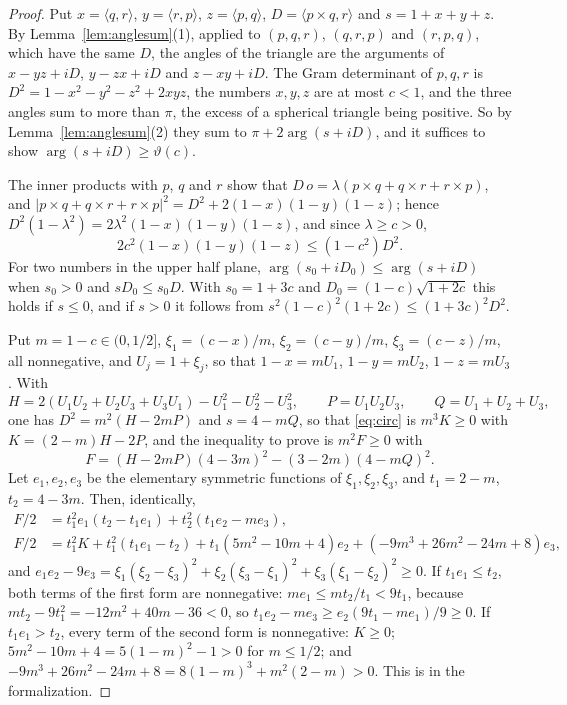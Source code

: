 \documentclass[12pt]{amsart}
\theoremstyle{definition}
\theoremstyle{plain}
\theoremstyle{definition}
\begin{document}
\begin{proof}
Put $x=\langle q,r\rangle$, $y=\langle r,p\rangle$, $z=\langle p,q\rangle$, $D=\langle p\times q,r\rangle$ and $s=1+x+y+z$. By Lemma~\ref{lem:anglesum}(1), applied to $(p,q,r)$, $(q,r,p)$ and $(r,p,q)$, which have the same $D$, the angles of the triangle are the arguments of $x-yz+iD$, $y-zx+iD$ and $z-xy+iD$. The Gram determinant of $p,q,r$ is $D^2=1-x^2-y^2-z^2+2xyz$, the numbers $x,y,z$ are at most $c<1$, and the three angles sum to more than $\pi$, the excess of a spherical triangle being positive. So by Lemma~\ref{lem:anglesum}(2) they sum to $\pi+2\arg(s+iD)$, and it suffices to show $\arg(s+iD)\ge\vartheta(c)$.

The inner products with $p$, $q$ and $r$ show that $D\,o=\lambda(p\times q+q\times r+r\times p)$, and $|p\times q+q\times r+r\times p|^2=D^2+2(1-x)(1-y)(1-z)$; hence $D^2(1-\lambda^2)=2\lambda^2(1-x)(1-y)(1-z)$, and since $\lambda\ge c>0$,
\begin{equation}\label{eq:circ}
2c^2(1-x)(1-y)(1-z)\le(1-c^2)D^2 .
\end{equation}
For two numbers in the upper half plane, $\arg(s_0+iD_0)\le\arg(s+iD)$ when $s_0>0$ and $sD_0\le s_0D$. With $s_0=1+3c$ and $D_0=(1-c)\sqrt{1+2c}$ this holds if $s\le0$, and if $s>0$ it follows from $s^2(1-c)^2(1+2c)\le(1+3c)^2D^2$.

Put $m=1-c\in(0,1/2]$, $\xi_1=(c-x)/m$, $\xi_2=(c-y)/m$, $\xi_3=(c-z)/m$, all nonnegative, and $U_j=1+\xi_j$, so that $1-x=mU_1$, $1-y=mU_2$, $1-z=mU_3$. With
\[
H=2(U_1U_2+U_2U_3+U_3U_1)-U_1^2-U_2^2-U_3^2,\qquad P=U_1U_2U_3,\qquad Q=U_1+U_2+U_3,
\]
one has $D^2=m^2(H-2mP)$ and $s=4-mQ$, so that \eqref{eq:circ} is $m^3K\ge0$ with $K=(2-m)H-2P$, and the inequality to prove is $m^2F\ge0$ with
\[
F=(H-2mP)(4-3m)^2-(3-2m)(4-mQ)^2 .
\]
Let $e_1,e_2,e_3$ be the elementary symmetric functions of $\xi_1,\xi_2,\xi_3$, and $t_1=2-m$, $t_2=4-3m$. Then, identically,
\begin{align*}
F/2&=t_1^2e_1(t_2-t_1e_1)+t_2^2(t_1e_2-me_3),\\
F/2&=t_1^2K+t_1^2(t_1e_1-t_2)+t_1(5m^2-10m+4)e_2+(-9m^3+26m^2-24m+8)e_3,
\end{align*}
and $e_1e_2-9e_3=\xi_1(\xi_2-\xi_3)^2+\xi_2(\xi_3-\xi_1)^2+\xi_3(\xi_1-\xi_2)^2\ge0$. If $t_1e_1\le t_2$, both terms of the first form are nonnegative: $me_1\le mt_2/t_1<9t_1$, because $mt_2-9t_1^2=-12m^2+40m-36<0$, so $t_1e_2-me_3\ge e_2(9t_1-me_1)/9\ge0$. If $t_1e_1>t_2$, every term of the second form is nonnegative: $K\ge0$; $5m^2-10m+4=5(1-m)^2-1>0$ for $m\le1/2$; and $-9m^3+26m^2-24m+8=8(1-m)^3+m^2(2-m)>0$. This is  in the formalization.
\end{proof}
\end{document}
